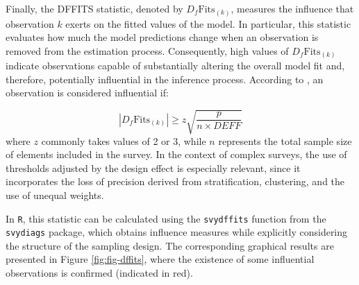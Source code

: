 \documentclass[
  english,
  12pt,
]{book}
\newenvironment{Shaded}{\begin{snugshade}}{\end{snugshade}}
\newcommand{\AttributeTok}[1]{\textcolor[rgb]{0.13,0.29,0.53}{#1}}
\newcommand{\DecValTok}[1]{\textcolor[rgb]{0.00,0.00,0.81}{#1}}
\newcommand{\FunctionTok}[1]{\textcolor[rgb]{0.13,0.29,0.53}{\textbf{#1}}}
\newcommand{\NormalTok}[1]{#1}
\newcommand{\OtherTok}[1]{\textcolor[rgb]{0.56,0.35,0.01}{#1}}
\newcommand{\SpecialCharTok}[1]{\textcolor[rgb]{0.81,0.36,0.00}{\textbf{#1}}}
\newcommand{\StringTok}[1]{\textcolor[rgb]{0.31,0.60,0.02}{#1}}
\begin{document}
Finally, the DFFITS statistic, denoted by \(D_f\text{Fits}_{(k)}\), measures the influence that observation \(k\) exerts on the fitted values of the model. In particular, this statistic evaluates how much the model predictions change when an observation is removed from the estimation process. Consequently, high values of \(D_f\text{Fits}_{(k)}\) indicate observations capable of substantially altering the overall model fit and, therefore, potentially influential in the inference process. According to \citet{Li_Valliant_2015}, an observation is considered influential if:

\[
|D_f\text{Fits}_{(k)}| \geq z\sqrt{\frac{p}{n\times DEFF}}
\]
where \(z\) commonly takes values of 2 or 3, while \(n\) represents the total sample size of elements included in the survey. In the context of complex surveys, the use of thresholds adjusted by the design effect is especially relevant, since it incorporates the loss of precision derived from stratification, clustering, and the use of unequal weights.

In \texttt{R}, this statistic can be calculated using the \texttt{svydffits} function from the \texttt{svydiags} package, which obtains influence measures while explicitly considering the structure of the sampling design. The corresponding graphical results are presented in Figure \ref{fig:fig-dffits}, where the existence of some influential observations is confirmed (indicated in red).

\begin{Shaded}
\end{Shaded}
\end{document}
